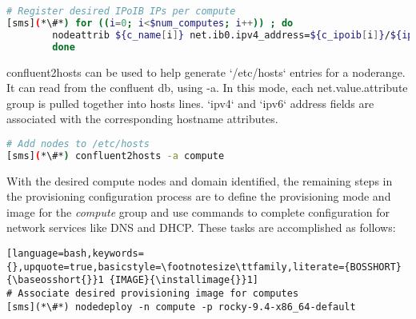 \begin{lstlisting}[language=bash,keywords={},upquote=true,basicstyle=\footnotesize\ttfamily]
# Register desired IPoIB IPs per compute
[sms](*\#*) for ((i=0; i<$num_computes; i++)) ; do
		nodeattrib ${c_name[i]} net.ib0.ipv4_address=${c_ipoib[i]}/${ipoib_netmask}
        done
\end{lstlisting}

confluent2hosts can be used to help generate `/etc/hosts` entries for a noderange.
It can read from the confluent db, using -a. In this mode, each net.value.attribute
group is pulled together into hosts lines. `ipv4` and `ipv6` address
fields are associated with the corresponding hostname attributes.

\begin{lstlisting}[language=bash,keywords={},upquote=true,basicstyle=\footnotesize\ttfamily]
# Add nodes to /etc/hosts
[sms](*\#*) confluent2hosts -a compute
\end{lstlisting}

With the desired compute nodes and domain identified, the remaining steps in the
provisioning configuration process are to define the provisioning mode and
image for the {\em compute} group and use \Confluent{} commands to complete
configuration for network services like DNS and DHCP. These tasks are
accomplished as follows:

\begin{lstlisting}[language=bash,keywords={},upquote=true,basicstyle=\footnotesize\ttfamily,literate={BOSSHORT}{\baseosshort{}}1 {IMAGE}{\installimage{}}1]
# Associate desired provisioning image for computes
[sms](*\#*) nodedeploy -n compute -p rocky-9.4-x86_64-default
\end{lstlisting}

